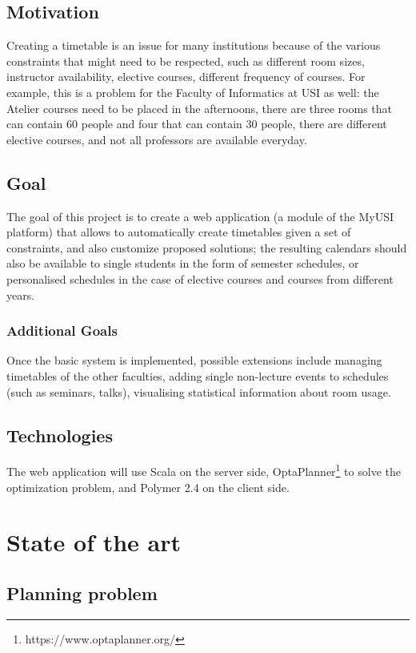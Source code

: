 \documentclass[12pt, a4paper, english]{report}
\begin{document}
\subsection{Motivation}
Creating a timetable is an issue for many institutions because of the various constraints that might need to be respected, such as different room sizes, instructor availability, elective courses, different frequency of courses.
For example, this is a problem for the Faculty of Informatics at USI as well: the Atelier courses need to be placed in the afternoons, there are three rooms that can contain 60 people and four that can contain 30 people, there are different elective courses, and not all professors are available everyday.

\subsection{Goal}
The goal of this project is to create a web application (a module of the MyUSI platform) that allows to automatically create timetables given a set of constraints, and also customize proposed solutions; the resulting calendars should also be available to single students in the form of semester schedules, or personalised schedules in the case of elective courses and courses from different years.

\subsubsection{Additional Goals}
Once the basic system is implemented, possible extensions include managing timetables of the other faculties, adding single non-lecture events to schedules (such as seminars, talks), visualising statistical information about room usage.

\subsection{Technologies}
The web application will use Scala on the server side, OptaPlanner\footnote{https://www.optaplanner.org/} to solve the optimization problem, and Polymer 2.4 on the client side.

\section{State of the art}
\subsection{Planning problem}
\end{document}
